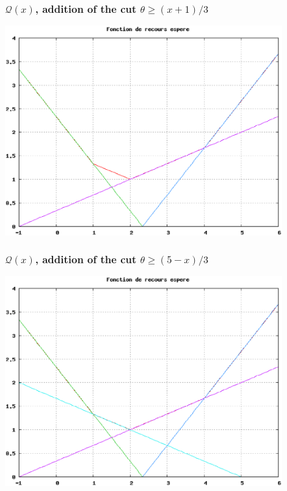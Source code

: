\documentclass{beamer}
\begin{document}
\begin{frame}
	\frametitle{$\mathcal{Q}(x)$, addition of the cut $\theta \geq (x+1)/3$}
	
	\includegraphics[width=0.9\textwidth]{coupe_3.eps}
	
\end{frame}

\begin{frame}
\frametitle{$\mathcal{Q}(x)$, addition of the cut $\theta \geq (5-x)/3$}
	
\includegraphics[width=0.9\textwidth]{coupe_4.eps}
	
\end{frame}
\end{document}
